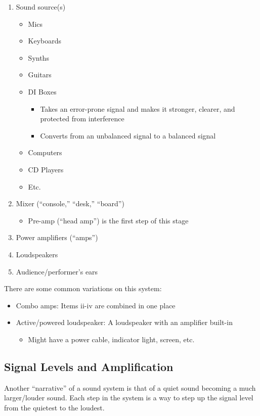 \documentclass[a4paper]{article}
\begin{document}
\begin{enumerate}
	\item Sound source(s)
		\begin{itemize}
			\item Mics
			\item Keyboards
			\item Synths
			\item Guitars
			\item DI Boxes
				\begin{itemize}
					\item Takes an error-prone signal and
						makes it stronger, clearer, and
						protected from interference
					\item Converts from an unbalanced
						signal to a balanced signal
				\end{itemize}
			\item Computers
			\item CD Players
			\item Etc.
		\end{itemize}
	\item Mixer (``console,'' ``desk,'' ``board'')
		\begin{itemize}
			\item Pre-amp (``head amp'') is the first step of this stage
		\end{itemize}
	\item Power amplifiers (``amps'')
	\item Loudspeakers
	\item Audience/performer's ears
\end{enumerate}
There are some common variations on this system:
\begin{itemize}
	\item Combo amps: Items ii-iv are combined in one place
	\item Active/powered loudspeaker: A loudspeaker with an amplifier
		built-in
		\begin{itemize}
			\item Might have a power cable, indicator light,
				screen, etc.
		\end{itemize}
\end{itemize}

\subsection{Signal Levels and Amplification}
Another ``narrative'' of a sound system is that of a quiet sound becoming a
much larger/louder sound. Each step in the system is a way to step up the
signal level from the quietest to the loudest.
\end{document}
